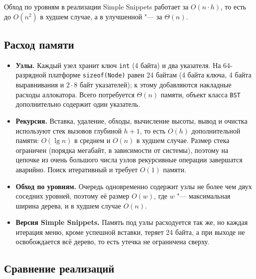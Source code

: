 \documentclass[otchet]{SCWorks}
\begin{document}
Обход по уровням в реализации Simple Snippets работает за $O(n \cdot h)$,
то есть до $O(n^2)$ в худшем случае, а в улучшенной "--- за $\Theta(n)$.

\subsection{Расход памяти}

\begin{itemize}
  \item \textbf{Узлы.} Каждый узел хранит ключ \texttt{int} (4 байта) и
        два указателя. На 64-разрядной платформе \texttt{sizeof(Node)}
        равен 24 байтам (4 байта ключа, 4 байта выравнивания и
        $2 \cdot 8$ байт указателей); к этому добавляются накладные расходы
        аллокатора. Всего потребуется $\Theta(n)$ памяти, объект класса
        \texttt{BST} дополнительно содержит один указатель.
  \item \textbf{Рекурсия.} Вставка, удаление, обходы, вычисление высоты,
        вывод и очистка используют стек вызовов глубиной $h+1$, то есть
        $O(h)$ дополнительной памяти: $O(\lg n)$ в среднем и $O(n)$ в
        худшем случае. Размер стека ограничен (порядка мегабайт, в
        зависимости от системы), поэтому на цепочке из очень большого
        числа узлов рекурсивные операции завершатся аварийно. Поиск
        итеративный и требует $O(1)$ памяти.
  \item \textbf{Обход по уровням.} Очередь одновременно содержит узлы не
        более чем двух соседних уровней, поэтому её размер $O(w)$, где $w$ "---
        максимальная ширина дерева, и в худшем случае $O(n)$.
  \item \textbf{Версия Simple Snippets.} Память под узлы расходуется так
        же, но каждая итерация меню, кроме успешной вставки, теряет
        24 байта, а при выходе не освобождается всё дерево, то есть
        утечка не ограничена сверху.
\end{itemize}

\subsection{Сравнение реализаций}
\end{document}
